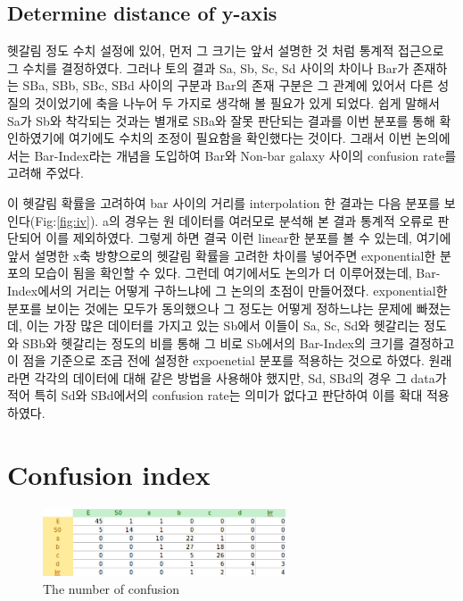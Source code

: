 \documentclass[a4paper,11pt]{article}
\begin{document}
\subsection{Determine distance of y-axis}

헷갈림 정도 수치 설정에 있어, 먼저 그 크기는 앞서 설명한 것 처럼 통계적 접근으로 그 수치를 결정하였다. 그러나 토의 결과 Sa, Sb, Sc, Sd 사이의 차이나 Bar가 존재하는 SBa, SBb, SBc, SBd 사이의 구분과 Bar의 존재 구분은 그 관계에 있어서 다른 성질의 것이었기에 축을 나누어 두 가지로 생각해 볼 필요가 있게 되었다. 쉽게 말해서 Sa가 Sb와 착각되는 것과는 별개로 SBa와 잘못 판단되는 결과를 이번 분포를 통해 확인하였기에 여기에도 수치의 조정이 필요함을 확인했다는 것이다. 그래서 이번 논의에서는 Bar-Index라는 개념을 도입하여 Bar와 Non-bar galaxy 사이의 confusion rate를 고려해 주었다. 

이 헷갈림 확률을 고려하여 bar 사이의 거리를 interpolation 한 결과는 다음 분포를 보인다(Fig:\ref{fig:iv}). a의 경우는 원 데이터를 여러모로 분석해 본 결과 통계적 오류로 판단되어 이를 제외하였다. 그렇게 하면 결국 이런 linear한 분포를 볼 수 있는데, 여기에 앞서 설명한 x축 방향으로의 헷갈림 확률을 고려한 차이를 넣어주면 exponential한 분포의 모습이 됨을 확인할 수 있다. 그런데 여기에서도 논의가 더 이루어졌는데, Bar-Index에서의 거리는 어떻게 구하느냐에 그 논의의 초점이 만들어졌다. exponential한 분포를 보이는 것에는 모두가 동의했으나 그 정도는 어떻게 정하느냐는 문제에 빠졌는데, 이는 가장 많은 데이터를 가지고 있는 Sb에서 이들이 Sa, Sc, Sd와 헷갈리는 정도와 SBb와 헷갈리는 정도의 비를 통해 그 비로 Sb에서의 Bar-Index의 크기를 결정하고 이 점을 기준으로 조금 전에 설정한 expoenetial 분포를 적용하는 것으로 하였다. 원래라면 각각의 데이터에 대해 같은 방법을 사용해야 했지만, Sd, SBd의 경우 그 data가 적어 특히 Sd와 SBd에서의 confusion rate는 의미가 없다고 판단하여 이를 확대 적용하였다.

\appendix
\section{Confusion index}
\label{sec:confuse}

\begin{figure}[h!]
\centering
\includegraphics[height=20mm, width=100 mm]{Dobby.png}
\caption{\label{fig:iii} The number of confusion}
\end{figure}
\end{document}
